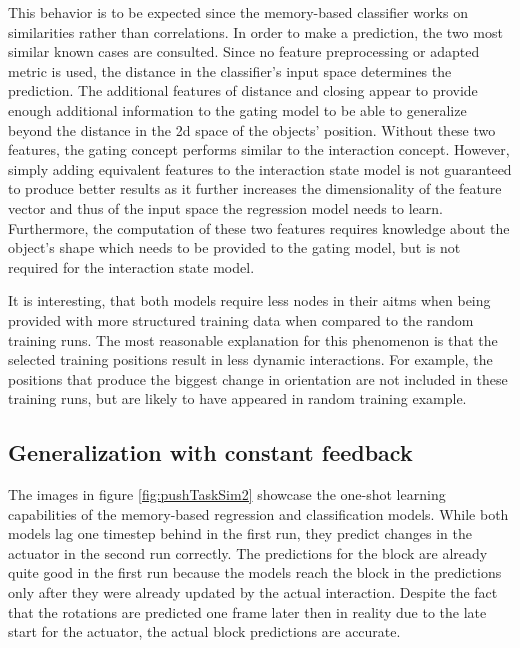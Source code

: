 This behavior is to be expected since the memory-based classifier works on similarities rather than correlations. In order to make a prediction, the two most similar known cases are consulted. Since no feature preprocessing or adapted metric is used, the distance in the classifier's input space determines the prediction. The additional features of distance and closing appear to provide enough additional information to the gating model to be able to generalize beyond the distance in the 2d space of the objects' position. Without these two features, the gating concept performs similar to the interaction concept.
However, simply adding equivalent features to the interaction state model is not guaranteed to produce better results as it further increases the dimensionality of the feature vector and thus of the input space the regression model needs to learn. Furthermore, the computation of these two features requires knowledge about the object's shape which needs to be provided to the gating model, but is not required for the interaction state model.

It is interesting, that both models require less nodes in their \glspl{aitm} when being provided with more structured training data when compared to the random training runs.
The most reasonable explanation for this phenomenon is that the selected training positions result in less dynamic interactions. For example, the positions that produce the biggest change in orientation are not included in these training runs, but are likely to have appeared in random training example.  


\subsection{Generalization with constant feedback} 

The images in figure \ref{fig:pushTaskSim2} showcase the one-shot learning capabilities of the memory-based regression and classification models. While both models lag one timestep behind in the first run, they predict changes in the actuator in the second run correctly.
The predictions for the block are already quite good in the first run because the models reach the block in the predictions only after they were already updated by the actual interaction. Despite the fact that the rotations are predicted one frame later then in reality due to the late start for the actuator, the actual block predictions are accurate.

